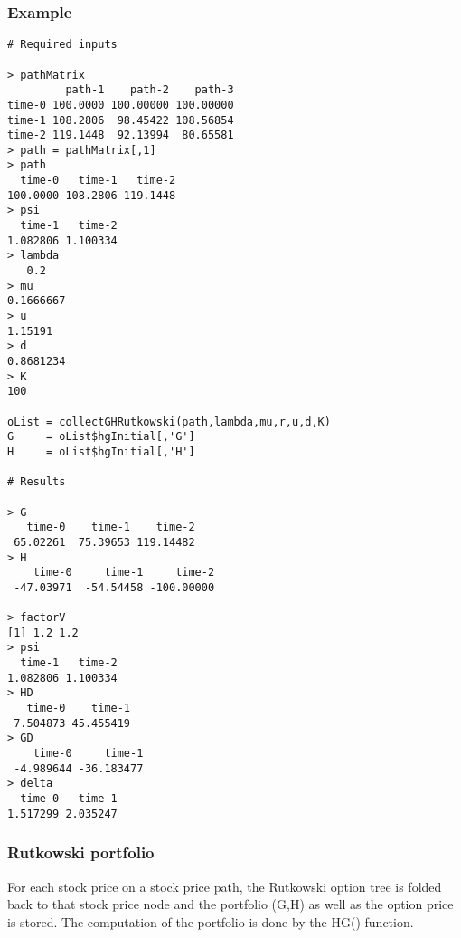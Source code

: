 \documentclass[10pt]{article}
\begin{document}
\subsubsection*{Example}

\begin{verbatim}
# Required inputs

> pathMatrix
         path-1    path-2    path-3
time-0 100.0000 100.00000 100.00000
time-1 108.2806  98.45422 108.56854
time-2 119.1448  92.13994  80.65581
> path = pathMatrix[,1]
> path
  time-0   time-1   time-2
100.0000 108.2806 119.1448
> psi
  time-1   time-2
1.082806 1.100334
> lambda
   0.2
> mu
0.1666667
> u
1.15191
> d
0.8681234
> K
100

oList = collectGHRutkowski(path,lambda,mu,r,u,d,K)
G     = oList$hgInitial[,'G']
H     = oList$hgInitial[,'H']

# Results

> G
   time-0    time-1    time-2
 65.02261  75.39653 119.14482
> H
    time-0     time-1     time-2
 -47.03971  -54.54458 -100.00000

> factorV
[1] 1.2 1.2
> psi
  time-1   time-2
1.082806 1.100334
> HD
   time-0    time-1
 7.504873 45.455419
> GD
    time-0     time-1
 -4.989644 -36.183477
> delta
  time-0   time-1
1.517299 2.035247
\end{verbatim}

\subsubsection*{Rutkowski portfolio}

For each stock price on a stock price path, the Rutkowski option tree is folded back
to that stock price node and the portfolio (G,H) as well as the option price is stored.
The computation of the portfolio is done by the HG() function.
\end{document}
